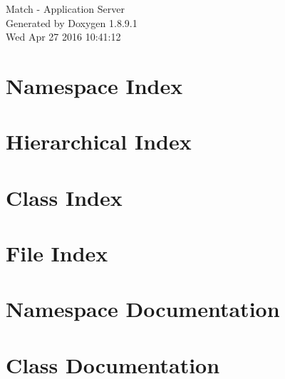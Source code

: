 \documentclass[twoside]{book}
\newcommand{\+}{\discretionary{\mbox{\scriptsize$\hookleftarrow$}}{}{}}
\newcommand{\clearemptydoublepage}{%
  \newpage{\pagestyle{empty}\cleardoublepage}%
}
\begin{document}
\hypersetup{pageanchor=false,
             bookmarks=true,
             bookmarksnumbered=true,
             pdfencoding=unicode
            }
\begin{titlepage}
\vspace*{7cm}
\begin{center}%
{\Large Match -\/ Application Server }\\
\vspace*{1cm}
{\large Generated by Doxygen 1.8.9.1}\\
\vspace*{0.5cm}
{\small Wed Apr 27 2016 10:41:12}\\
\end{center}
\end{titlepage}
\clearemptydoublepage
\tableofcontents
\clearemptydoublepage
{}
\hypersetup{pageanchor=true}

\chapter{Namespace Index}

\chapter{Hierarchical Index}

\chapter{Class Index}

\chapter{File Index}

\chapter{Namespace Documentation}


\chapter{Class Documentation}













\end{document}
